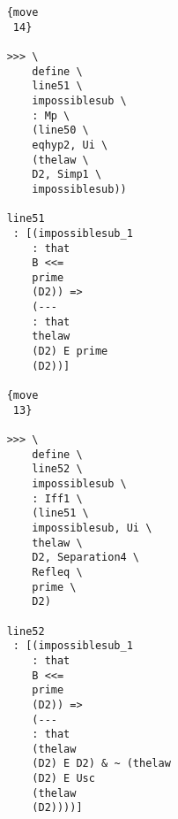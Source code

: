 \documentclass[12pt]{article}
\begin{document}
\begin{verbatim}
                                          {move 
                                           14}

                                          >>> \
                                              define \
                                              line51 \
                                              impossiblesub \
                                              : Mp \
                                              (line50 \
                                              eqhyp2, Ui \
                                              (thelaw \
                                              D2, Simp1 \
                                              impossiblesub))

                                          line51 
                                           : [(impossiblesub_1 
                                              : that 
                                              B <<= 
                                              prime 
                                              (D2)) => 
                                              (--- 
                                              : that 
                                              thelaw 
                                              (D2) E prime 
                                              (D2))]

                                          {move 
                                           13}

                                          >>> \
                                              define \
                                              line52 \
                                              impossiblesub \
                                              : Iff1 \
                                              (line51 \
                                              impossiblesub, Ui \
                                              thelaw \
                                              D2, Separation4 \
                                              Refleq \
                                              prime \
                                              D2)

                                          line52 
                                           : [(impossiblesub_1 
                                              : that 
                                              B <<= 
                                              prime 
                                              (D2)) => 
                                              (--- 
                                              : that 
                                              (thelaw 
                                              (D2) E D2) & ~ (thelaw 
                                              (D2) E Usc 
                                              (thelaw 
                                              (D2))))]


\end{verbatim}
\end{document}
